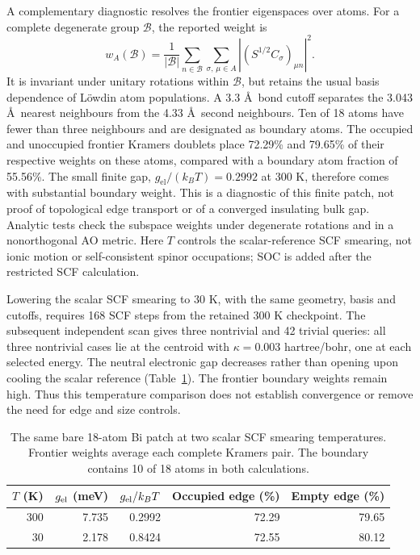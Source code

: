 \documentclass[11pt]{article}
\begin{document}
A complementary diagnostic resolves the frontier eigenspaces over
atoms. For a complete degenerate group $\mathcal B$, the reported
weight is
\begin{equation}
 w_A(\mathcal B)=\frac{1}{|\mathcal B|}
 \sum_{n\in\mathcal B}\sum_{\sigma,\,\mu\in A}
 |(S^{1/2}C_\sigma)_{\mu n}|^2.
\end{equation}
It is invariant under unitary rotations within $\mathcal B$, but
retains the usual basis dependence of L\"owdin atom populations.
A 3.3 \AA\ bond cutoff separates the 3.043 \AA\ nearest neighbours
from the 4.33 \AA\ second neighbours. Ten of 18 atoms have fewer
than three neighbours and are designated as boundary atoms.
The occupied and unoccupied frontier Kramers doublets place
72.29\% and 79.65\% of their respective weights on these atoms,
compared with a boundary atom fraction of 55.56\%.
The small finite gap, $g_{\mathrm{el}}/(k_BT)=0.2992$ at 300 K,
therefore comes with substantial boundary weight. This is a
diagnostic of this finite patch, not proof of topological edge
transport or of a converged insulating bulk gap. Analytic tests
check the subspace weights under degenerate rotations and in a
nonorthogonal AO metric.
Here $T$ controls the scalar-reference SCF smearing, not ionic
motion or self-consistent spinor occupations; SOC is added after
the restricted SCF calculation.

Lowering the scalar SCF smearing to 30 K, with the same geometry,
basis and cutoffs, requires 168 SCF steps from the retained 300 K
checkpoint. The subsequent independent scan gives three nontrivial
and 42 trivial queries: all three nontrivial cases lie at the
centroid with $\kappa=0.003$ hartree/bohr, one at each selected
energy. The neutral electronic gap decreases rather than opening
upon cooling the scalar reference (Table~\ref{tab:bi-neutral}).
The frontier boundary weights remain high. Thus this temperature
comparison does not establish convergence or remove the need for
edge and size controls.

\begin{table}[htbp]
\centering\small
\caption{The same bare 18-atom Bi patch at two scalar SCF smearing
temperatures. Frontier weights average each complete Kramers pair.
The boundary contains 10 of 18 atoms in both calculations.}
\label{tab:bi-neutral}
\begin{tabular}{rrrrr}
\toprule
$T$ (K) & $g_{\rm el}$ (meV) & $g_{\rm el}/k_BT$ &
Occupied edge (\%) & Empty edge (\%)\\
\midrule
300 & 7.735 & 0.2992 & 72.29 & 79.65\\
30 & 2.178 & 0.8424 & 72.55 & 80.12\\
\bottomrule
\end{tabular}
\end{table}
\end{document}
